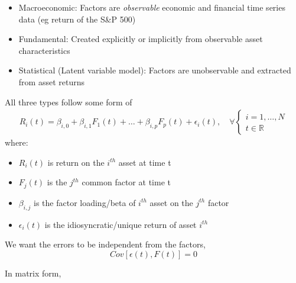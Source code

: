 \documentclass[
  oneside]{book}
\providecommand{\tightlist}{%
  \setlength{\itemsep}{0pt}\setlength{\parskip}{0pt}}
\begin{document}
\begin{itemize}
\tightlist
\item
  Macroeconomic: Factors are \emph{observable} economic and financial time series data (eg return of the S\&P 500)
\item
  Fundamental: Created explicitly or implicitly from observable asset characteristics
\item
  Statistical (Latent variable model): Factors are unobservable and extracted from asset returns
\end{itemize}

All three types follow some form of
\[
\begin{aligned}
R_{i}(t) = \beta_{i,0} + \beta_{i,1}F_{1}(t)+\dots+\beta_{i,p}F_{p}(t)+\epsilon_{i}(t), \quad \forall \begin{cases}
i=1,\dots, N \\
t \in \mathbb{R}
\end{cases}
\end{aligned}
\]
where:

\begin{itemize}
\tightlist
\item
  \(R_{i}(t)\) is return on the \(i^{th}\) asset at time t
\item
  \(F_{j}(t)\) is the \(j^{th}\) common factor at time t
\item
  \(\beta_{i,j}\) is the factor loading/beta of \(i^{th}\) asset on the \(j^{th}\) factor
\item
  \(\epsilon_{i}(t)\) is the idiosyncratic/unique return of asset \(i^{th}\)
\end{itemize}

We want the errors to be independent from the factors,
\[
Cov[\epsilon(t), F(t)] = 0
\]

In matrix form,
\end{document}

